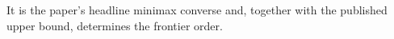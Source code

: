 It is the paper's headline minimax converse and, together with the published upper bound, determines the frontier order.